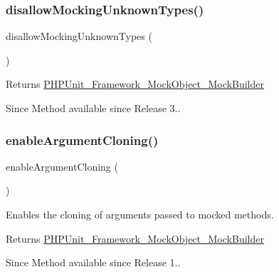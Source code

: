 \subsubsection{\texorpdfstring{disallow\+Mocking\+Unknown\+Types()}{disallowMockingUnknownTypes()}}
{\footnotesize\ttfamily disallow\+Mocking\+Unknown\+Types (\begin{DoxyParamCaption}{ }\end{DoxyParamCaption})}

\begin{DoxyReturn}{Returns}
\mbox{\hyperlink{class_p_h_p_unit___framework___mock_object___mock_builder}{P\+H\+P\+Unit\+\_\+\+Framework\+\_\+\+Mock\+Object\+\_\+\+Mock\+Builder}}
\end{DoxyReturn}
\begin{DoxySince}{Since}
Method available since Release 3.. 
\end{DoxySince}
\mbox{\label{class_p_h_p_unit___framework___mock_object___mock_builder_a8e48ca0c7e6a7a3a55018e8b1767050e}} 
\subsubsection{\texorpdfstring{enable\+Argument\+Cloning()}{enableArgumentCloning()}}
{\footnotesize\ttfamily enable\+Argument\+Cloning (\begin{DoxyParamCaption}{ }\end{DoxyParamCaption})}

Enables the cloning of arguments passed to mocked methods.

\begin{DoxyReturn}{Returns}
\mbox{\hyperlink{class_p_h_p_unit___framework___mock_object___mock_builder}{P\+H\+P\+Unit\+\_\+\+Framework\+\_\+\+Mock\+Object\+\_\+\+Mock\+Builder}}
\end{DoxyReturn}
\begin{DoxySince}{Since}
Method available since Release 1.. 
\end{DoxySince}
\mbox{\label{class_p_h_p_unit___framework___mock_object___mock_builder_a0ba499758ad2a729532aabad1fbb0abe}} 
